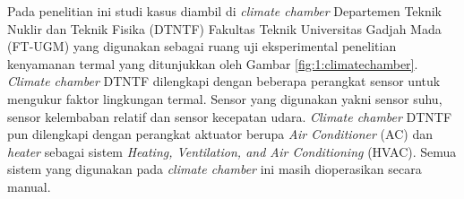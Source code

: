 

Pada penelitian ini studi kasus diambil di \textit{climate chamber} Departemen Teknik Nuklir dan Teknik Fisika (DTNTF) Fakultas Teknik Universitas Gadjah Mada (FT-UGM) yang digunakan sebagai ruang uji eksperimental penelitian kenyamanan termal yang ditunjukkan oleh Gambar \ref{fig:1:climatechamber}. \textit{Climate chamber} DTNTF dilengkapi dengan beberapa perangkat sensor untuk mengukur faktor lingkungan termal. Sensor yang digunakan yakni sensor suhu, sensor kelembaban relatif dan sensor kecepatan udara. \textit{Climate chamber} DTNTF pun dilengkapi dengan perangkat aktuator berupa \textit{Air Conditioner} (AC) dan \textit{heater} sebagai sistem \textit{Heating, Ventilation, and Air Conditioning} (HVAC). Semua sistem yang digunakan pada \textit{climate chamber} ini masih dioperasikan secara manual.

